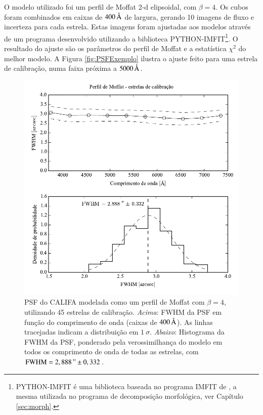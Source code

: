 O modelo utilizado foi um perfil de Moffat 2-d elipsoidal, com $\beta = 4$. Os
cubos foram combinados em caixas de $400\,\text{\normalfont\AA}$ de largura, gerando 10
imagens de fluxo e incerteza para cada estrela. Estas imagens foram ajustadas
aos modelos através de um programa desenvolvido utilizando a biblioteca
PYTHON-IMFIT\footnote{PYTHON-IMFIT é uma biblioteca baseada no programa IMFIT de
\citet{Erwin2015}, a mesma utilizada no programa de decomposição morfológica,
ver Capítulo \ref{sec:morph}.}. O resultado do ajuste são os parâmetros do
perfil de Moffat e a estatística $\chi^2$ do melhor modelo. A Figura
\ref{fig:PSFExemplo} ilustra o ajuste feito para uma estrela de calibração, numa
faixa próxima a $5000\,\text{\normalfont\AA}$.

\begin{figure}
	\includegraphics{figuras/PSFMoffatBeta4_calib}
	\caption[PSF do CALIFA -- estrelas de calibração.]
	{PSF do CALIFA modelada como um perfil de Moffat com $\beta=4$, utilizando 45
	estrelas de calibração. {\em Acima}: FWHM da PSF em função do comprimento de
	onda (caixas de $400\,\text{\normalfont\AA}$). As linhas tracejadas indicam a distribuição
	em $1\ \sigma$. {\em Abaixo}: Histograma da FWHM da PSF, ponderado pela
	verossimilhança do modelo em todos os comprimento de onda de todas as estrelas,
	com $\mathrm{FWHM}=2,888\," \pm 0,332$.}
	\label{fig:PSFCalib}
\end{figure}


